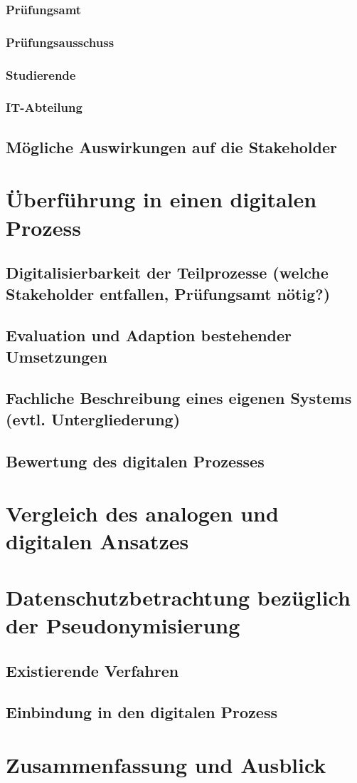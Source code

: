 \documentclass[ngerman]{tudscrreprt}
\begin{document}
\subsection{Prüfungsamt}

\subsection{Prüfungsausschuss}

\subsection{Studierende}

\subsection{IT-Abteilung}

\section{Mögliche Auswirkungen auf die Stakeholder}

\chapter{Überführung in einen digitalen Prozess}

\section{Digitalisierbarkeit der Teilprozesse (welche Stakeholder entfallen, Prüfungsamt nötig?)}

\section{Evaluation und Adaption bestehender Umsetzungen}

\section{Fachliche Beschreibung eines eigenen Systems (evtl. Untergliederung)}

\section{Bewertung des digitalen Prozesses}

\chapter{Vergleich des analogen und digitalen Ansatzes}

\chapter{Datenschutzbetrachtung bezüglich der Pseudonymisierung}

\section{Existierende Verfahren}

\section{Einbindung in den digitalen Prozess}

\chapter{Zusammenfassung und Ausblick}
\end{document}
